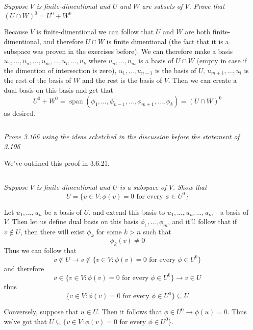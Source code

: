 \documentclass[11pt,oneside,titlepage]{book}
\DeclareMathOperator \Span {span}
\begin{document}
\subsection{}

\textit{Suppose $V$ is finite-dimentional and $U$ and $W$ are subsets of $V$. Prove that
  $(U \cap W)^0 = U^0 + W^0$}

Because $V$ is finite-dimentional we can follow that $U$ and $W$ are both finite-dimentional,
and therefore $U \cap W$ is finite dimentional (the fact that it is a subspace was proven in the
exercises before). We can therefore make a basis $u_1, ..., u_n, ..., u_m, ..., u_l, ..., u_k$
where $u_n, ..., u_m$ is a basis of $U \cap W$ (empty in case if the dimention of intersection
is zero), $u_1, ..., u_{n - 1}$ is the basis of $U$, $u_{m + 1}, ..., u_l$ is the rest of the
basis of $W$ and the rest is the basis of $V$. Then we can create a dual basis on this basis and
get that
$$U^0 + W^0 = \Span(\phi_1, ..., \phi_{n - 1}, ..., \phi_{m + 1}, ..., \phi_k) = (U \cap W)^0$$
as desired.

\subsection{}

\textit{Prove 3.106 using the ideas scketched in the discussion before the statement of 3.106}

We've outlined this proof in 3.6.21.

\subsection{}

\textit{Suppose $V$ is finite-dimentional and $U$ is a subspace of $V$. Show that }
$$U = \{v \in V: \phi(v) = 0 \text{ for every } \phi \in U^0 \}$$

Let $u_1, ..., u_n$ be a basis of $U$, and extend this basis to $u_1, ..., u_n, ..., u_m$ - a
basis of $V$. Then let us define dual basis on this basis $\phi_1, ..., \phi_m$, and it'll
follow that if $v \notin U$, then there will exist $\phi_k$ for some $k > n$ such that
$$\phi_k(v) \neq 0$$
Thus we can follow that
$$v \notin U \to v \notin  \{v \in V: \phi(v) = 0 \text{ for every } \phi \in U^0 \}$$
and therefore 
$$ v \in  \{v \in V: \phi(v) = 0 \text{ for every } \phi \in U^0 \} \to v \in U$$
thus
$$\{v \in V: \phi(v) = 0 \text{ for every } \phi \in U^0 \} \subseteq U$$

Conversely, suppose
that $u \in U$. Then it follows that $\phi \in U^0 \to \phi(u) = 0$. Thus we've got that
$U \subseteq  \{v \in V: \phi(v) = 0 \text{ for every } \phi \in U^0 \}$.
\end{document}
